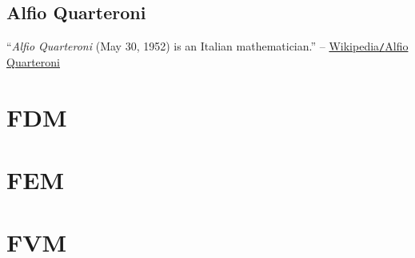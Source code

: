 \documentclass[oneside]{book}
\numberwithin{equation}{section}
\begin{document}
\section{Alfio Quarteroni}
``\textit{Alfio Quarteroni} (May 30, 1952) is an Italian mathematician.'' -- \href{https://en.wikipedia.org/wiki/Alfio_Quarteroni}{Wikipedia\texttt{/}Alfio Quarteroni}


\chapter{FDM}


\chapter{FEM}


\chapter{FVM}


\printbibliography[heading=bibintoc]
	
\end{document}
